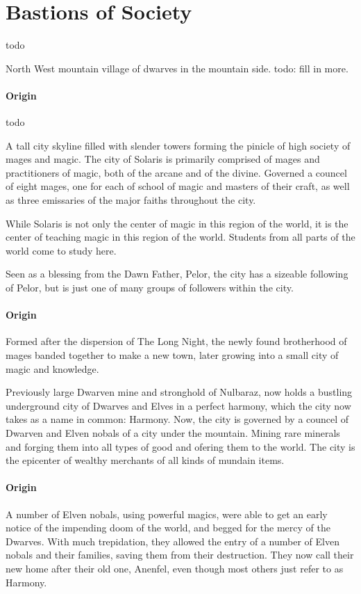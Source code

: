 \documentclass[letterpaper,twocolumn,openany,nodeprecatedcode]{dndbook}
\begin{document}
\section{Bastions of Society}

todo


North West mountain village of dwarves in the mountain side. todo: fill in more.

\paragraph{Origin}
todo


A tall city skyline filled with slender towers forming the pinicle of high society of
mages and magic. The city of Solaris is primarily comprised of mages and practitioners
of magic, both of the arcane and of the divine. Governed a councel of eight mages, one
for each of school of magic and masters of their craft, as well as three emissaries of
the major faiths throughout the city.

While Solaris is not only the center of magic in this region of the world, it is the
center of teaching magic in this region of the world. Students from all parts of the
world come to study here.

Seen as a blessing from the Dawn Father, Pelor, the city has a sizeable following of
Pelor, but is just one of many groups of followers within the city.

\paragraph{Origin}
Formed after the dispersion of The Long Night, the newly found brotherhood of mages banded
together to make a new town, later growing into a small city of magic and knowledge.


Previously large Dwarven mine and stronghold of Nulbaraz, now holds a bustling underground
city of Dwarves and Elves in a perfect harmony, which the city now takes as a name in common:
Harmony. Now, the city is governed by a councel of Dwarven and Elven nobals of a city under
the mountain. Mining rare minerals and forging them into all types of good and ofering them
to the world. The city is the epicenter of wealthy merchants of all kinds of mundain items.

\paragraph{Origin}
A number of Elven nobals, using powerful magics, were able to get an early notice of the
impending doom of the world, and begged for the mercy of the Dwarves. With much trepidation,
they allowed the entry of a number of Elven nobals and their families, saving them from their
destruction. They now call their new home after their old one, Anenfel, even though most
others just refer to as Harmony.
\end{document}
